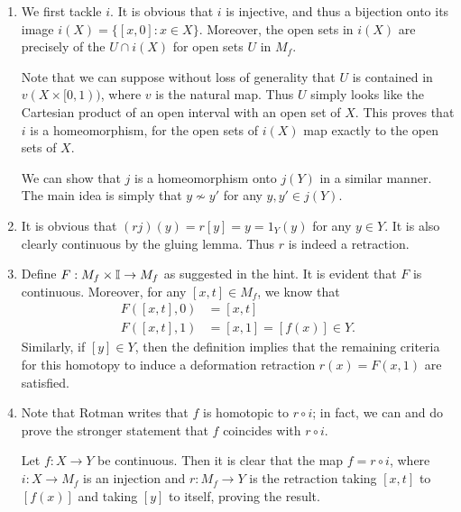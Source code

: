 \documentclass[../solutions.tex]{subfiles}
\begin{document}
\begin{exercise} \leavevmode
\begin{enumerate}
\item We first tackle $i$. It is obvious that $i$ is injective, and thus a bijection onto its image $i(X)=\{[x,0]:x\in X\}$. Moreover, the open sets in $i(X)$ are precisely of the $U\cap i(X)$ for open sets $U$ in $M_f$. 

Note that we can suppose without loss of generality that $U$ is contained in $v(X\times[0,1))$, where $v$ is the natural map. Thus $U$ simply looks like the Cartesian product of an open interval with an open set of $X$. This proves that $i$ is a homeomorphism, for the open sets of $i(X)$ map exactly to the open sets of $X$. 

We can show that $j$ is a homeomorphism onto $j(Y)$ in a similar manner. The main idea is simply that $y\not\sim y'$ for any $y,y'\in j(Y)$. 

\item It is obvious that $(rj)(y)=r[y]=y=1_Y(y)$ for any $y\in Y$. It is also clearly continuous by the gluing lemma. Thus $r$ is indeed a retraction. 

\item Define $F:M_f\times\mathbb I\to M_f$ as suggested in the hint. It is evident that $F$ is continuous. Moreover, for any $[x,t]\in M_f$, we know that \begin{align*}F([x,t],0)&=[x,t]\\F([x,t],1)&=[x,1]=[f(x)]\in Y.\end{align*} Similarly, if $[y]\in Y$, then the definition implies that the remaining criteria for this homotopy to induce a deformation retraction $r(x)=F(x,1)$ are satisfied. 

\item Note that Rotman writes that $f$ is homotopic to $r\circ i$; in fact, we can and do prove the stronger statement that $f$ coincides with $r\circ i$. 

Let $f:X\to Y$ be continuous. Then it is clear that the map $f=r\circ i$, where $i:X\to M_f$ is an injection and $r:M_f\to Y$ is the retraction taking $[x,t]$ to $[f(x)]$ and taking $[y]$ to itself, proving the result. 
\end{enumerate} 
\end{exercise} 
\end{document}
